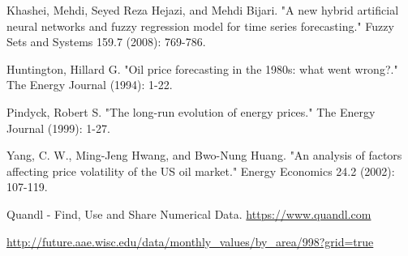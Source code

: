 \documentclass[runningheads]{llncs}
\begin{document}
\begin{thebibliography}{4}
Khashei, Mehdi, Seyed Reza Hejazi, and Mehdi Bijari. "A new hybrid artificial neural networks and fuzzy regression model for time series forecasting." Fuzzy Sets and Systems 159.7 (2008): 769-786.

 Huntington, Hillard G. "Oil price forecasting in the 1980s: what went wrong?." The Energy Journal (1994): 1-22.

 Pindyck, Robert S. "The long-run evolution of energy prices." The Energy Journal (1999): 1-27.

 Yang, C. W., Ming-Jeng Hwang, and Bwo-Nung Huang. "An analysis of factors affecting price volatility of the US oil market." Energy Economics 24.2 (2002): 107-119.

 Quandl - Find, Use and Share Numerical Data. \url{https://www.quandl.com}

\url{http://future.aae.wisc.edu/data/monthly_values/by_area/998?grid=true}

\end{thebibliography}
\end{document}
